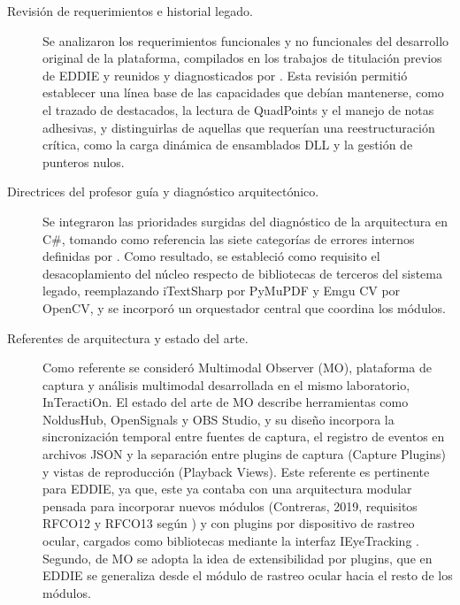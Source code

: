\begin{description}
    \item[Revisión de requerimientos e historial legado.] Se analizaron los requerimientos funcionales y no funcionales del desarrollo original de la plataforma, compilados en los trabajos de titulación previos de EDDIE \citep{carrasco2017diseno,contreras2019desarrollo,montanares2019desarrollo,pezoa2020implementacion,estay2020integracion,santibanez2020rediseno} y reunidos y diagnosticados por \cite{ibaceta2023evaluacion}. Esta revisión permitió establecer una línea base de las capacidades que debían mantenerse, como el trazado de destacados, la lectura de QuadPoints y el manejo de notas adhesivas, y distinguirlas de aquellas que requerían una reestructuración crítica, como la carga dinámica de ensamblados DLL y la gestión de punteros nulos.
 
    \item[Directrices del profesor guía y diagnóstico arquitectónico.] Se integraron las prioridades surgidas del diagnóstico de la arquitectura en C\#, tomando como referencia las siete categorías de errores internos definidas por \cite{ibaceta2023evaluacion}. Como resultado, se estableció como requisito el desacoplamiento del núcleo respecto de bibliotecas de terceros del sistema legado, reemplazando iTextSharp por PyMuPDF y Emgu CV por OpenCV, y se incorporó un orquestador central que coordina los módulos.
 
    \item[Referentes de arquitectura y estado del arte.] Como referente se consideró Multimodal Observer (MO), plataforma de captura y análisis multimodal desarrollada en el mismo laboratorio, InTeractiOn. El estado del arte de MO \citep{figueroa2025arquitectura} describe herramientas como NoldusHub, OpenSignals y OBS Studio, y su diseño incorpora la sincronización temporal entre fuentes de captura, el registro de eventos en archivos JSON y la separación entre plugins de captura (Capture Plugins) y vistas de reproducción (Playback Views). Este referente es pertinente para EDDIE, ya que, este ya contaba con una arquitectura modular pensada para incorporar nuevos módulos (Contreras, 2019, requisitos RFCO12 y RFCO13 según \cite{ibaceta2023evaluacion}) y con plugins por dispositivo de rastreo ocular, cargados como bibliotecas mediante la interfaz IEyeTracking \citep{estay2020integracion}. Segundo, de MO se adopta la idea de extensibilidad por plugins, que en EDDIE se generaliza desde el módulo de rastreo ocular hacia el resto de los módulos.
 

\end{description}
